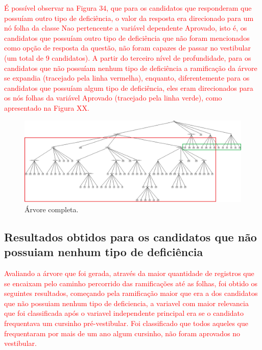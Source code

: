 \par
\textcolor{red}{É possível observar na Figura 34, que para os candidatos que responderam que possuíam outro tipo de deficiência, o valor da resposta era direcionado para um nó folha da classe Nao pertencente a variável dependente Aprovado, isto é, os candidatos que possuíam outro tipo de deficiência que não foram mencionados como opção de resposta da questão, não foram capazes de passar no vestibular (um total de 9 candidatos). A partir do terceiro nível de profundidade, para os candidatos que não possuíam nenhum tipo de deficiência a ramificação da árvore se expandia (tracejado pela linha vermelha), enquanto, diferentemente para os candidatos que possuíam algum tipo de deficiência, eles eram direcionados para os nós folhas da variável Aprovado (tracejado pela linha verde), como apresentado na Figura XX.}

\par
\begin{figure}[!htp]
	\begin{center}
    \caption{\label{fig:waveform_fig} Árvore completa.}
	\includegraphics[scale=0.45]{Figuras/Arvore_completa.png}
	\end{center}
\end{figure}


\subsection{Resultados obtidos para os candidatos que não possuiam nenhum tipo de deficiência}


\par
\textcolor{red}{Avaliando a árvore que foi gerada, através da maior quantidade de registros que se encaixam pelo caminho percorrido das ramificações até as folhas, foi obtido os seguintes resultados, começando pela ramificação maior que era a dos candidatos que não possuiam nenhum tipo de deficiencia, a variavel com maior relevancia que foi classificada após o variavel independente principal era se o candidato frequentava um cursinho pré-vestibular. Foi classificado que todos aqueles que frequentaram por mais de um ano algum cursinho, não foram aprovados no vestibular.}

